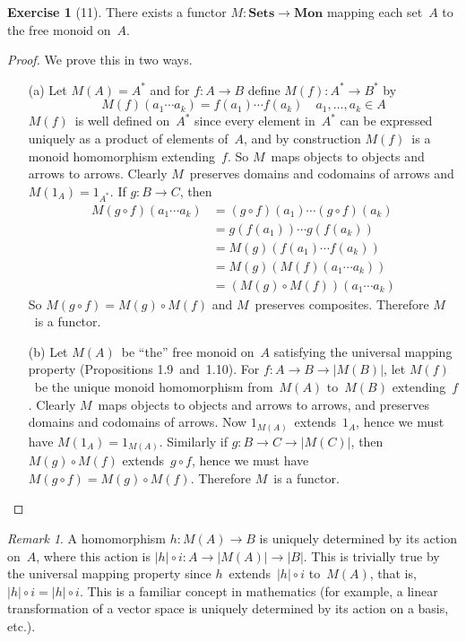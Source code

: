 \documentclass[letterpaper,12pt]{article}
\newcommand{\after}{\circ}
\renewcommand{\star}[1]{#1^{*}}
\newcommand{\cat}[1]{\mathbf{#1}}
\newcommand{\under}[1]{|{#1}|}
\newcommand{\2}{\cat{2}}
\newcommand{\Sets}{\cat{Sets}}
\newcommand{\Mon}{\cat{Mon}}
\theoremstyle{definition}
\newtheorem*{exer}{Exercise}
\theoremstyle{remark}
\newtheorem*{rmk}{Remark}
\theoremstyle{direction}
\begin{document}
\begin{exer}[11]
There exists a functor \(M:\Sets\to\Mon\) mapping each set~\(A\) to the free monoid on~\(A\).
\end{exer}
\begin{proof}
We prove this in two ways.
\begin{enumerate}[itemsep=0pt]
\item[(a)] Let \(M(A)=\star{A}\) and for \(f:A\to B\) define \(M(f):\star{A}\to\star{B}\) by
\[M(f)(a_1\cdots a_k)=f(a_1)\cdots f(a_k)\quad a_1,\ldots,a_k\in A\]
\(M(f)\)~is well defined on~\(\star{A}\) since every element in~\(\star{A}\) can be expressed uniquely as a product of elements of~\(A\), and by construction \(M(f)\)~is a monoid homomorphism extending~\(f\). So \(M\)~maps objects to objects and arrows to arrows. Clearly \(M\)~preserves domains and codomains of arrows and \(M(1_A)=1_{\star{A}}\). If \(g:B\to C\), then
\begin{align*}
M(g\after f)(a_1\cdots a_k)&=(g\after f)(a_1)\cdots(g\after f)(a_k)\\
	&=g(f(a_1))\cdots g(f(a_k))\\
	&=M(g)(f(a_1)\cdots f(a_k))\\
	&=M(g)(M(f)(a_1\cdots a_k))\\
	&=(M(g)\after M(f))(a_1\cdots a_k)
\end{align*}
So \(M(g\after f)=M(g)\after M(f)\) and \(M\)~preserves composites. Therefore \(M\)~is a functor.
\item[(b)] Let \(M(A)\)~be ``the'' free monoid on~\(A\) satisfying the universal mapping property (Propositions 1.9~and~1.10). For \(f:A\to B\to\under{M(B)}\), let \(M(f)\)~be the unique monoid homomorphism from~\(M(A)\) to~\(M(B)\) extending~\(f\). Clearly \(M\)~maps objects to objects and arrows to arrows, and preserves domains and codomains of arrows. Now \(1_{M(A)}\)~extends~\(1_A\), hence we must have \(M(1_A)=1_{M(A)}\). Similarly if \(g:B\to C\to\under{M(C)}\), then \(M(g)\after M(f)\) extends~\(g\after f\), hence we must have \(M(g\after f)=M(g)\after M(f)\). Therefore \(M\)~is a functor.\qedhere
\end{enumerate}
\end{proof}
\begin{rmk}
A homomorphism \(h:M(A)\to B\) is uniquely determined by its action on~\(A\), where this action is \(\under{h}\after i:A\to\under{M(A)}\to\under{B}\). This is trivially true by the universal mapping property since \(h\)~extends~\(\under{h}\after i\) to~\(M(A)\), that is, \(\under{h}\after i=\under{h}\after i\). This is a familiar concept in mathematics (for example, a linear transformation of a vector space is uniquely determined by its action on a basis, etc.).
\end{rmk}
\end{document}
